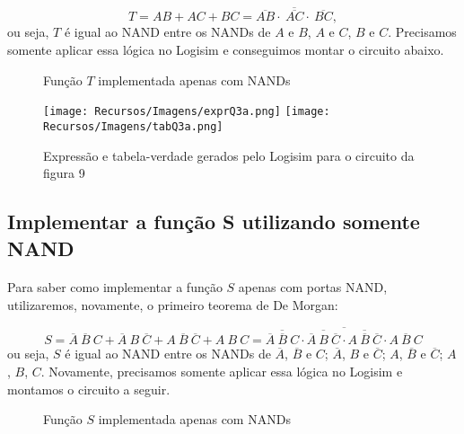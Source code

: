 \documentclass[a4paper, 12pt]{article}
\begin{document}
\[
T = AB + AC + BC = \overline{\overline{AB} \cdot \ \overline{AC} \cdot \ \overline{BC}},
\]
ou seja, $T$ é igual ao NAND entre os NANDs de $A$ e $B$, $A$ e $C$, $B$ e $C$. Precisamos somente aplicar essa lógica no Logisim e conseguimos montar o circuito abaixo.

\begin{figure}[H]
    \centering
    
    \vspace{-30pt}
    \caption{Função $T$ implementada apenas com NANDs}
\end{figure}

\begin{figure}[H]
    \centering
    \texttt{[image: Recursos/Imagens/exprQ3a.png]}
    \texttt{[image: Recursos/Imagens/tabQ3a.png]} \\
    \caption{Expressão e tabela-verdade gerados pelo Logisim para o circuito da figura 9}
\end{figure}

\subsection{Implementar a função S utilizando somente NAND}
\paragraph{}
Para saber como implementar a função $S$ apenas com portas NAND, utilizaremos, novamente, o primeiro teorema de De Morgan:

\[
S = \overline{A} \ \overline{B} \ C + \overline{A} \ B \ \overline{C} + A \ \overline{B} \ \overline{C} + A \ B \ C = \overline{\overline{\overline{A} \ \overline{B} \ C} \cdot \overline{\overline{A} \ B \ \overline{C}} \cdot \overline{A \ \overline{B} \ \overline{C}} \cdot \overline{A \ B \ C}}
\]
ou seja, $S$ é igual ao NAND entre os NANDs de $\overline{A}$, $\overline{B}$ e $C$; $\overline{A}$, $B$ e $\overline{C}$; $A$, $\overline{B}$ e $\overline{C}$; $A$, $B$, $C$. Novamente, precisamos somente aplicar essa lógica no Logisim e montamos o circuito a seguir.

\begin{figure}[H]
    \centering
    
    \vspace{-30pt}
    \caption{Função $S$ implementada apenas com NANDs}
    \vspace{-10pt}
\end{figure}
\end{document}
